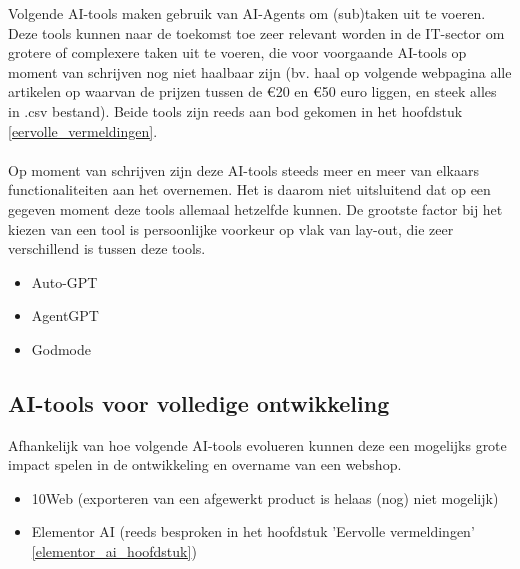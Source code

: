 Volgende AI-tools maken gebruik van AI-Agents om (sub)taken uit te voeren. Deze tools kunnen naar de toekomst toe zeer relevant worden in de IT-sector om grotere of complexere taken uit te voeren, die voor voorgaande AI-tools op moment van schrijven nog niet haalbaar zijn (bv. haal op volgende webpagina alle artikelen op waarvan de prijzen tussen de €20 en €50 euro liggen, en steek alles in .csv bestand). Beide tools zijn reeds aan bod gekomen in het hoofdstuk \ref{eervolle_vermeldingen}.
\\\\
Op moment van schrijven zijn deze AI-tools steeds meer en meer van elkaars functionaliteiten aan het overnemen. Het is daarom niet uitsluitend dat op een gegeven moment deze tools allemaal hetzelfde kunnen. De grootste factor bij het kiezen van een tool is persoonlijke voorkeur op vlak van lay-out, die zeer verschillend is tussen deze tools.
\begin{itemize}
    \item Auto-GPT
    \item AgentGPT
    \item Godmode
\end{itemize}
\label{ai_tools_volledige_ontwikkeling}\subsection{AI-tools voor volledige ontwikkeling}
Afhankelijk van hoe volgende AI-tools evolueren kunnen deze een mogelijks grote impact spelen in de ontwikkeling en overname van een webshop. 
\begin{itemize}
    \item 10Web (exporteren van een afgewerkt product is helaas (nog) niet mogelijk)
    \item Elementor AI (reeds besproken in het hoofdstuk 'Eervolle vermeldingen' \ref{elementor_ai_hoofdstuk})
\end{itemize}    
